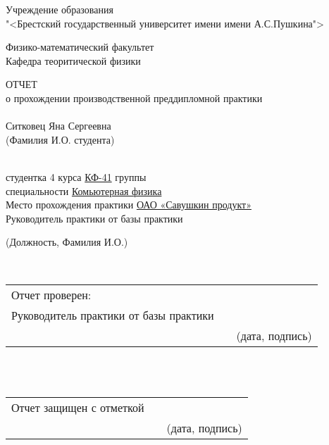 \begin{center}
      Учреждение образования \\
"<Брестский государственный университет имени имени А.С.Пушкина"> \\
\end{center}
\begin{center}
    Физико-математический факультет \\
    Кафедра теоритической физики 
\end{center}
\begin{center}
\MakeUppercase{отчет} \\
о прохождении производственной преддипломной практики \\ \\
Ситковец Яна Сергеевна \\
\hline \hspace{0.5 cm} \footnotesize{ (Фамилия И.О. студента)} 
\end{center}
\hspace{20pt} \\
студентка 4 курса \underline{КФ-41} группы \\
специальности \underline{Комьютерная физика} \\
Место прохождения практики \underline{ОАО «Савушкин продукт»} \\
Руководитель практики от базы практики 
\\  
\begin{center}
\hline \hspace{1 cm} \footnotesize{ (Должность, Фамилия И.О.)} 
\end{center}
\hspace{15pt}\\

\noindent
 \begin{tabular}{lp{2em}l} 
 Отчет проверен: \\
 Руководитель практики от базы практики & \hspace{1 mm} \\\cline{3-3} 
   \hspace{3  cm}    && \footnotesize{(дата, подпись)}
  \end{tabular} \\ \\

  
  \noindent
 \begin{tabular}{lp{9em}l} 
 Отчет защищен с отметкой  & \hspace{1 mm} \\\cline{3-3} 
   \hspace{3  cm}    && \footnotesize{(дата, подпись)}
  \end{tabular} \\ \\

